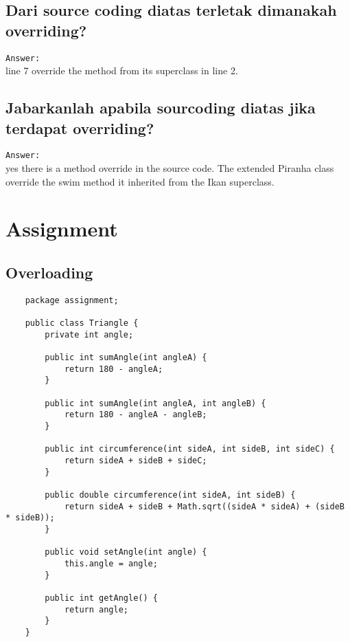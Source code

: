 \documentclass[12pt,titlepage]{article}
\begin{document}
\subsection{\textnormal{Dari source coding diatas terletak dimanakah overriding?}}
\texttt{Answer:}\\
line 7 override the method from its superclass in line 2.
\subsection{\textnormal{Jabarkanlah apabila sourcoding diatas jika terdapat overriding?}}
\texttt{Answer:}\\
yes there is a method override in the source code. The extended Piranha class override the swim method it inherited from the Ikan superclass.

\newpage

\section{Assignment}
\subsection{Overloading}
\begin{verbatim}
    package assignment;

    public class Triangle {
        private int angle;

        public int sumAngle(int angleA) {
            return 180 - angleA;
        }

        public int sumAngle(int angleA, int angleB) {
            return 180 - angleA - angleB;
        }

        public int circumference(int sideA, int sideB, int sideC) {
            return sideA + sideB + sideC;
        }

        public double circumference(int sideA, int sideB) {
            return sideA + sideB + Math.sqrt((sideA * sideA) + (sideB * sideB));
        }

        public void setAngle(int angle) {
            this.angle = angle;
        }

        public int getAngle() {
            return angle;
        }
    }
\end{verbatim}

\newpage
\end{document}
